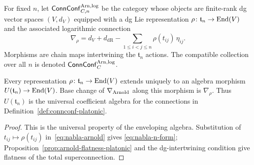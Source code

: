 \begin{definition}
\label{def:connconf-platonic}
For fixed $n$, let $\mathsf{ConnConf}^{\mathrm{Arn,log}}_{C,n}$ be the
category whose objects are finite-rank dg vector spaces $(V,d_V)$
equipped with a dg Lie representation
\(
 \rho\colon\mathfrak t_n\to\mathrm{End}(V)
\)
and the associated logarithmic connection
\begin{equation}
\label{eq:nabla-n-form}
 \nabla_{\rho}
 =d_V+d_{\mathrm{dR}}
 -\sum_{1\leq i<j\leq n}\rho(t_{ij})\,\eta_{ij}.
\end{equation}
Morphisms are chain maps intertwining the $\mathfrak t_n$ actions.
The compatible collection over all $n$ is denoted
$\mathsf{ConnConf}^{\mathrm{Arn,log}}_{C}$.
\end{definition}

\begin{remark}
\label{rem:connconf-initial-platonic}
Every representation $\rho\colon\mathfrak t_n\to\mathrm{End}(V)$ extends
uniquely to an algebra morphism
$U(\mathfrak t_n)\to\mathrm{End}(V)$.  Base change of
$\nabla_{\mathrm{Arnold}}$ along this morphism is $\nabla_\rho$.  Thus
$U(\mathfrak t_n)$ is the universal coefficient algebra for the
connections in Definition~\ref{def:connconf-platonic}.
\end{remark}

\begin{proof}
This is the universal property of the enveloping algebra.  Substitution
of $t_{ij}\mapsto\rho(t_{ij})$ in~\eqref{eq:nabla-arnold} gives
\eqref{eq:nabla-n-form}; Proposition~\ref{prop:arnold-flatness-platonic}
and the dg-intertwining condition give flatness of the total
superconnection.
\end{proof}

